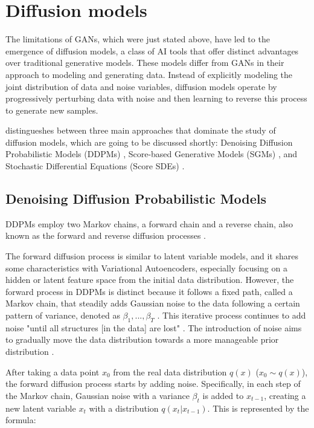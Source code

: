 \section{Diffusion models}
\label{diffusion Models}

The limitations of GANs, which were just stated above, have led to the emergence of diffusion models, a class of AI tools that offer distinct advantages over traditional generative models. These models differ from GANs in their approach to modeling and generating data.  Instead of explicitly modeling the joint distribution of data and noise variables, diffusion models operate by progressively perturbing data with noise and then learning to reverse this process to generate new samples.

\citeauthor{yangdiffusionSummary} distingueshes between three main approaches that dominate the study of diffusion models, which are going to be discussed shortly: Denoising Diffusion Probabilistic Models (DDPMs) \citep{hoDDPMs,sohlDDPM}, Score-based Generative Models (SGMs) \citep{song2019SGM}, and Stochastic Differential Equations (Score SDEs) \citep{song2020score, song2021maximum}.

\subsection{Denoising Diffusion Probabilistic Models}
DDPMs employ two Markov chains, a forward chain and a reverse chain, also known as the forward and reverse diffusion processes \citep{sohlDDPM}. 

The forward diffusion process is similar to latent variable models, and it shares some characteristics with Variational Autoencoders, especially focusing on a hidden or latent feature space from the initial data distribution. However, the forward process in DDPMs is distinct because it follows a fixed path, called a Markov chain, that steadily adds Gaussian noise to the data following a certain pattern of variance, denoted as \( \beta_1, ..., \beta_T \) \citep{hoDDPMs}. This iterative process continues to add noise "until all structures [in the data] are lost" \citep{yangdiffusionSummary}. The introduction of noise aims to gradually move the data distribution towards a more manageable prior distribution \citep{yangdiffusionSummary, pooleDreamfusion}.

After taking a data point \( x_0 \) from the real data distribution \( q(x) \) (\( x_0 \sim q(x) \)), the forward diffusion process starts by adding noise. Specifically, in each step of the Markov chain, Gaussian noise with a variance \( \beta_t \) is added to \( x_{t-1} \), creating a new latent variable \( x_t \) with a distribution \( q(x_t | x_{t-1}) \). This is represented by the formula: 

